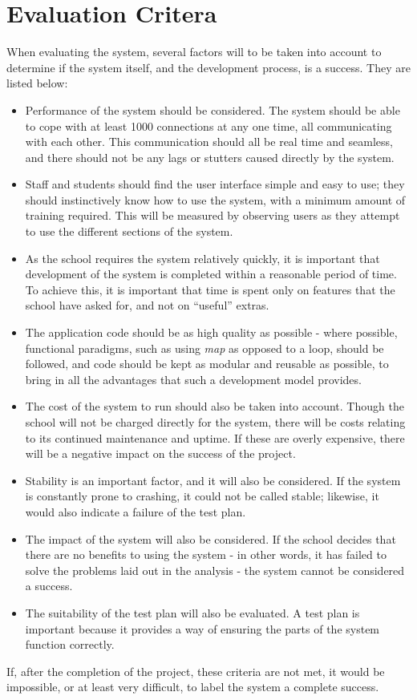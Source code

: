 \section{Evaluation Critera}
When evaluating the system, several factors will to be taken into account to determine if the system itself, and the development process, is a success. They are listed below:

\begin{itemize}
\item Performance of the system should be considered. The system should be able to cope with at least 1000 connections at any one time, all communicating with each other. This communication should all be real time and seamless, and there should not be any lags or stutters caused directly by the system.

\item Staff and students should find the user interface simple and easy to use; they should instinctively know how to use the system, with a minimum amount of training required. This will be measured by observing users as they attempt to use the different sections of the system.

\item As the school requires the system relatively quickly, it is important that development of the system is completed within a reasonable period of time. To achieve this, it is important that time is spent only on features that the school have asked for, and not on ``useful'' extras.

\item The application code should be as high quality as possible - where possible, functional paradigms, such as using \textit{map} as opposed to a loop, should be followed, and code should be kept as modular and reusable as possible, to bring in all the advantages that such a development model provides.

\item The cost of the system to run should also be taken into account. Though the school will not be charged directly for the system, there will be costs relating to its continued maintenance and uptime. If these are overly expensive, there will be a negative impact on the success of the project.

\item Stability is an important factor, and it will also be considered. If the system is constantly prone to crashing, it could not be called stable; likewise, it would also indicate a failure of the test plan.

\item The impact of the system will also be considered. If the school decides that there are no benefits to using the system - in other words, it has failed to solve the problems laid out in the analysis - the system cannot be considered a success.

\item The suitability of the test plan will also be evaluated. A test plan is important because it provides a way of ensuring the parts of the system function correctly.
\end{itemize}

If, after the completion of the project, these criteria are not met, it would be impossible, or at least very difficult, to label the system a complete success.
